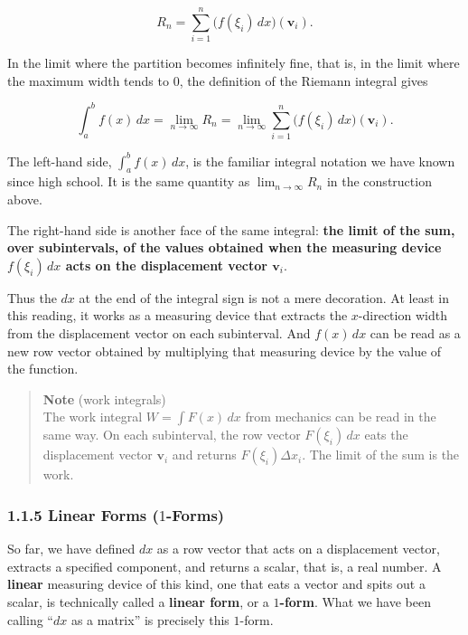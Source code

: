 \[
R_n
=
\sum_{i=1}^n
\bigl(f(\xi_i)\,dx\bigr)(\mathbf{v}_i).
\]

In the limit where the partition becomes infinitely fine, that is, in
the limit where the maximum width tends to \(0\), the definition of the
Riemann integral gives

\[
\int_a^b f(x)\,dx
=
\lim_{n\to\infty} R_n
=
\lim_{n\to\infty}
\sum_{i=1}^n
\bigl(f(\xi_i)\,dx\bigr)(\mathbf{v}_i).
\]

The left-hand side, \(\int_a^b f(x)\,dx\), is the familiar integral
notation we have known since high school. It is the same quantity as
\(\lim_{n\to\infty}R_n\) in the construction above.

The right-hand side is another face of the same integral:
\textbf{the limit of the sum, over subintervals, of the values obtained when the measuring device $f(\xi_i)\,dx$ acts on the displacement vector $\mathbf{v}_i$}.

Thus the \(dx\) at the end of the integral sign is not a mere
decoration. At least in this reading, it works as a measuring device
that extracts the \(x\)-direction width from the displacement vector on
each subinterval. And \(f(x)\,dx\) can be read as a new row vector
obtained by multiplying that measuring device by the value of the
function.

\begin{quote}
\textbf{Note} (work integrals)\\
The work integral \(W=\int F(x)\,dx\) from mechanics can be read in the
same way. On each subinterval, the row vector \(F(\xi_i)\,dx\) eats the
displacement vector \(\mathbf{v}_i\) and returns \(F(\xi_i)\Delta x_i\).
The limit of the sum is the work.
\end{quote}

\hypertarget{linear-forms-1-forms}{%
\subsubsection{\texorpdfstring{1.1.5 Linear Forms
(\(1\)-Forms)}{1.1.5 Linear Forms (1-Forms)}}\label{linear-forms-1-forms}}

So far, we have defined \(dx\) as a row vector that acts on a
displacement vector, extracts a specified component, and returns a
scalar, that is, a real number. A \textbf{linear} measuring device of
this kind, one that eats a vector and spits out a scalar, is technically
called a \textbf{linear form}, or a \textbf{$1$-form}. What we have been
calling ``\(dx\) as a matrix'' is precisely this \(1\)-form.

